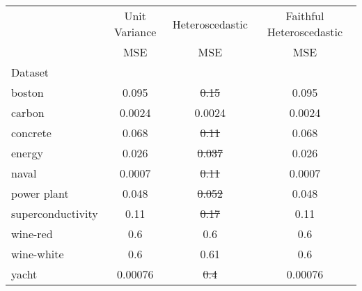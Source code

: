 \begin{tabular}{l|c|c|c}
\toprule
{} & {Unit Variance} & {Heteroscedastic} & {Faithful Heteroscedastic} \\
{} & {MSE} & {MSE} & {MSE} \\
{Dataset} & {} & {} & {} \\
\midrule
boston & 0.095 & \sout{0.15} & 0.095 \\
carbon & 0.0024 & 0.0024 & 0.0024 \\
concrete & 0.068 & \sout{0.11} & 0.068 \\
energy & 0.026 & \sout{0.037} & 0.026 \\
naval & 0.0007 & \sout{0.11} & 0.0007 \\
power plant & 0.048 & \sout{0.052} & 0.048 \\
superconductivity & 0.11 & \sout{0.17} & 0.11 \\
wine-red & 0.6 & 0.6 & 0.6 \\
wine-white & 0.6 & 0.61 & 0.6 \\
yacht & 0.00076 & \sout{0.4} & 0.00076 \\
\bottomrule
\end{tabular}
